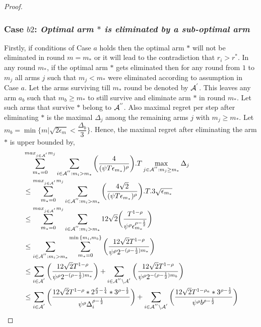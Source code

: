 \begin{proof}
\subsubsection*{Case $b2$: \textit{Optimal arm ${*}$ is eliminated by a sub-optimal arm  }}


	Firstly, if conditions of Case $a$ holds then the optimal arm ${*}$ will not be eliminated in round $m=m_{*}$ or it will lead to the contradiction that $r_{i}>r^{*}$. In any round $m_{*}$, if the optimal arm ${*}$ gets eliminated then for any round from $1$ to $m_{j}$ all arms ${j}$ such that $m_{j}< m_{*}$ were eliminated according to assumption in Case $a$. Let the arms surviving till $m_{*}$ round be denoted by $\mathcal{A}^{'}$. This leaves any arm $a_{b}$ such that $m_{b}\geq m_{*}$ to still survive and eliminate arm ${*}$ in round $m_{*}$. Let such arms that survive ${*}$ belong to $\mathcal{A}^{''}$. Also maximal regret per step after eliminating ${*}$ is the maximal $\Delta_{j}$ among the remaining arms ${j}$ with $m_{j}\geq m_{*}$.  Let $m_{b}=\min\lbrace m|\sqrt{2\epsilon_{m}}<\dfrac{\Delta_{b}}{3}\rbrace$. Hence, the maximal regret after eliminating the arm ${*}$ is upper bounded by, 
\begin{align*}
&\sum_{m_{*}=0}^{max_{j\in \A^{'}}m_{j}}\sum_{i\in \A^{''}:m_{i}>m_{*}}\bigg(\dfrac{4}{(\psi  T\epsilon_{m_{*}})^{\rho}} \bigg).T\max_{j\in \A^{''}:m_{j}\geq m_{*}}{\Delta}_{j}\\
&\leq\sum_{m_{*}=0}^{max_{j\in \A^{'}}m_{j}}\sum_{i\in \A^{''}:m_{i}>m_{*}}\bigg(\dfrac{4\sqrt{2}}{(\psi  T\epsilon_{m_{*}})^{\rho}} \bigg).T.3\sqrt{\epsilon_{m_{*}}}\\
&\leq\sum_{m_{*}=0}^{max_{j\in \A^{'}}m_{j}}\sum_{i\in \A^{''}:m_{i}>m_{*}}12\sqrt{2}\bigg(\dfrac{T^{1-\rho}}{\psi^{\rho}\epsilon_{m_{*}}^{\rho-\frac{1}{2}}} \bigg)\\
&\leq\sum_{i\in \A^{''}:m_{i}>m_{*}}\sum_{m_{*}=0}^{\min{\lbrace m_{i},m_{b}\rbrace}}\bigg(\dfrac{12\sqrt{2}T^{1-\rho}}{\psi^{\rho}2^{-(\rho -\frac{1}{2})m_{*}}} \bigg)\\
&\leq\sum_{i\in \A^{'}}\bigg(\dfrac{12\sqrt{2}T^{1-\rho}}{\psi^{\rho}2^{-(\rho -\frac{1}{2})m_{*}}} \bigg)+\sum_{i\in \A^{''}\setminus \A^{'}}\bigg(\dfrac{12\sqrt{2}T^{1-\rho }}{\psi^{\rho}2^{-(\rho -\frac{1}{2})m_{b}}} \bigg)\\
&\leq\sum_{i\in \A^{'}}\bigg(\dfrac{12\sqrt{2}T^{1-\rho}*2^{\frac{\rho}{2}-\frac{1}{4}}*3^{\rho -\frac{1}{2}}}{\psi^{\rho}\Delta_{i}^{\rho -\frac{1}{2}}} \bigg)+\sum_{i\in \A^{''}\setminus \A^{'}}\bigg(\dfrac{12\sqrt{2}T^{1-\rho_{a}}*3^{\rho -\frac{1}{2}}}{\psi^{\rho}b^{\rho -\frac{1}{2}}} \bigg)\\

\end{align*}
\end{proof}

